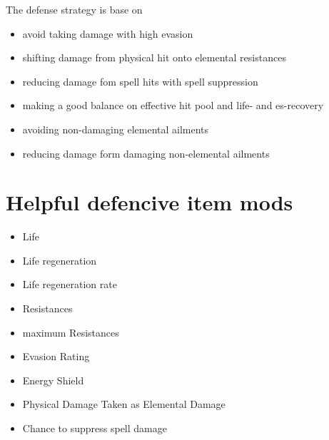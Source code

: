 The defense strategy is base on
\begin{itemize}
	\item avoid taking damage with high evasion
	\item shifting damage from physical hit onto elemental resistances
	\item reducing damage fom spell hits with spell suppression
	\item making a good balance on effective hit pool and life- and es-recovery
	\item avoiding non-damaging elemental ailments
	\item reducing damage form damaging non-elemental ailments
\end{itemize}

\section{Helpful defencive item mods}
\begin{itemize}
	\item Life
	\item Life regeneration
	\item Life regeneration rate
	\item Resistances
	\item maximum Resistances
	\item Evasion Rating
	\item Energy Shield
	\item Physical Damage Taken as Elemental Damage
	\item Chance to suppress spell damage
\end{itemize}